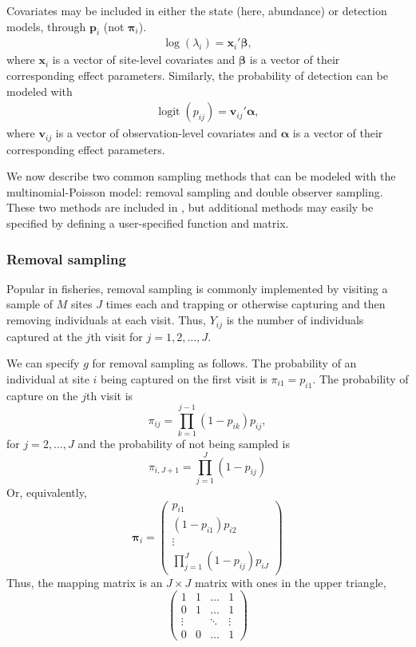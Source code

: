 \documentclass[article,shortnames]{jss}
\DeclareMathOperator{\logit}{logit}
\newcommand{\um}{\pkg{unmarked}}
\begin{document}
Covariates may be included in either the
state (here, abundance) or detection models, through $\mathbf p_{i}$
(not $\boldsymbol \pi_{i}$).
\begin{gather}
  \log(\lambda_i) = \mathbf x_i' \mathbf \beta,
\end{gather}
where $\mathbf x_i$ is a vector of site-level covariates and $\mathbf \beta$
is a vector of their corresponding effect parameters.  Similarly, the
probability of detection can be modeled with
\begin{gather}
  \logit(p_{ij}) = \mathbf v_{ij}' \mathbf \alpha,
\end{gather}
where $\mathbf v_{ij}$ is a vector of observation-level covariates and
$\mathbf \alpha$ is a vector of their corresponding effect parameters.

We now describe two common sampling methods that can be modeled
with the multinomial-Poisson model: removal sampling and double
observer sampling.  These two methods are included in \um, but
additional methods may easily be specified by defining a user-specified 
 function and  matrix.

\subsubsection{Removal sampling }

Popular in fisheries, removal sampling is commonly implemented by 
visiting a sample of $M$ sites $J$ times each and trapping or 
otherwise capturing and then removing individuals at each visit.  Thus, 
$Y_{ij}$ is the number of individuals captured at the $j$th visit for 
$j=1,2,\dots,J$.

We can specify $g$ for removal sampling as follows.  The
probability of an individual at site $i$ being captured on the first
visit is $\pi_{i1} = p_{i1}$.  The probability of capture on the $j$th
visit is
\begin{equation}
  \pi_{ij} = \prod_{k=1}^{j-1}(1 - p_{ik})p_{ij},
\end{equation}
for $j=2,\dots,J$ and the probability of not being sampled is
\begin{equation}
  \pi_{i,J+1} = \prod_{j=1}^{J}(1-p_{ij})
\end{equation}
Or, equivalently,
\begin{equation}
  \mathbf \pi_i =
  \begin{pmatrix}
    p_{i1} \\
    (1-p_{i1})p_{i2} \\
    \vdots \\
    \prod_{j=1}^J(1-p_{ij})p_{iJ}
  \end{pmatrix}
\end{equation}
Thus, the mapping matrix is an $J \times J$  matrix with ones in
the upper triangle,
\begin{equation}
  \begin{pmatrix}
    1 & 1 & \dots & 1 \\
    0 & 1 & \dots & 1 \\
    \vdots & & \ddots & \vdots \\
    0 & 0 & \dots  & 1
  \end{pmatrix}
\end{equation}
\end{document}
